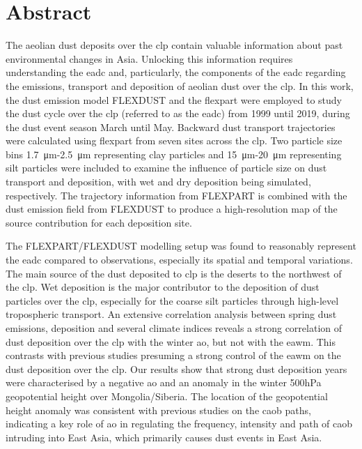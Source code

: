 \chapter*{Abstract}
The aeolian dust deposits over the \acrfull{clp} contain valuable information about past environmental changes in Asia. Unlocking this information requires understanding the \acrfull{eadc} and, particularly, the components of the \acrshort{eadc} regarding the emissions, transport and deposition of aeolian dust over the \acrshort{clp}. 
In this work, the dust emission model FLEXDUST and the \acrfull{flexpart} were employed to study the dust cycle over the \acrshort{clp} (referred to as the \acrshort{eadc}) from 1999 until 2019, during the dust event season March until May.
Backward dust transport trajectories were calculated using \acrshort{flexpart} from seven sites across the \acrshort{clp}. Two particle size bins \SI{1.7}{\micro\metre}-\SI{2.5}{\micro\metre} representing clay particles and  \SI{15}{\micro\metre}-\SI{20}{\micro\metre} representing silt particles were included to examine the influence of particle size on dust transport and deposition, with wet and dry deposition being simulated, respectively.
The trajectory information from FLEXPART is combined with the dust emission field from FLEXDUST to produce a high-resolution map of the source contribution for each deposition site. 

The FLEXPART/FLEXDUST modelling setup was found to reasonably represent the \acrshort{eadc} compared to observations, especially its spatial and temporal variations. 
The main source of the dust deposited to \acrshort{clp} is the deserts to the northwest of the \acrshort{clp}. 
Wet deposition is the major contributor to the deposition of dust particles over the \acrshort{clp}, especially for the coarse silt particles through high-level tropospheric transport. 
An extensive correlation analysis between spring dust emissions, deposition and several climate indices reveals a strong correlation of dust deposition over the \acrshort{clp} with the winter \acrshort{ao}, but not with the \acrshort{eawm}. 
This contrasts with previous studies presuming a strong control of the \acrshort{eawm} on the dust deposition over the \acrshort{clp}.
Our results show that strong dust deposition years were characterised by a negative \acrshort{ao} and an anomaly in the winter 500hPa geopotential height over Mongolia/Siberia. 
The location of the geopotential height anomaly was consistent with previous studies on the \acrfull{caob} paths, indicating a key role of \acrshort{ao} in regulating the frequency, intensity and path of \acrshort{caob} intruding into East Asia, which primarily causes dust events in East Asia.



